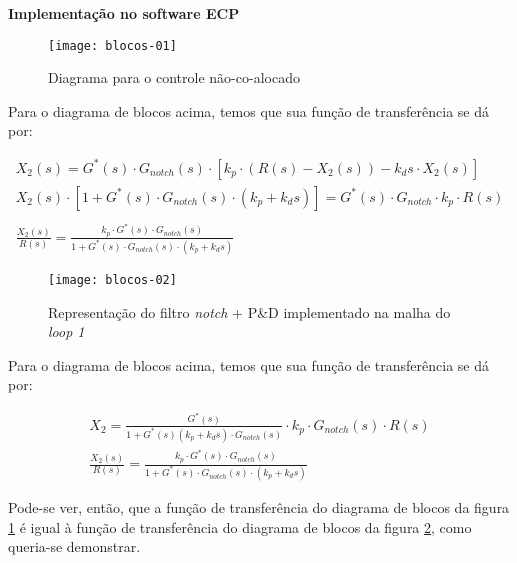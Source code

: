 \documentclass[a4paper,11pt]{article}
\begin{document}
\textbf{Implementação no software ECP}

\begin{figure}[H]
\centering
\texttt{[image: blocos-01]}
\caption{Diagrama para o controle não-co-alocado}
\label{fig:blocos-01}
\end{figure}

Para o diagrama de blocos acima, temos que sua função de transferência se dá
por:

\begin{gather*}
  X_2\left(s\right) = G^\ast\left(s\right) \cdot G_{notch}\left(s\right) \cdot
    \left[k_p \cdot \left(R\left(s\right) - X_2\left(s\right)\right) -
    k_d s \cdot X_2\left(s\right)\right] \\
  X_2\left(s\right) \cdot \left[1 +  G^\ast\left(s\right) \cdot
    G_{notch}\left(s\right) \cdot \left(k_p + k_d s\right)\right] =
    G^\ast\left(s\right) \cdot G_{notch} \cdot k_p \cdot R\left(s\right) \\ \\
  \frac{X_2\left(s\right)}{R\left(s\right)} = \frac{k_p \cdot
    G^\ast\left(s\right) \cdot G_{notch}\left(s\right)}{1 + G^\ast\left(s\right)
    \cdot G_{notch}\left(s\right) \cdot \left(k_p + k_d s\right)}
\end{gather*}

\begin{figure}[H]
\centering
\texttt{[image: blocos-02]}
\caption{Representação do filtro \textit{notch} + P\&D implementado na malha do
\textit{loop 1}}
\label{fig:blocos-02}
\end{figure}

Para o diagrama de blocos acima, temos que sua função de transferência se dá
por:

\begin{gather*}
  X_2 = \frac{G^\ast\left(s\right)}{1 + G^\ast\left(s\right) \left(k_p +
    k_d s\right) \cdot G_{notch}\left(s\right)} \cdot k_p \cdot
    G_{notch}\left(s\right) \cdot R\left(s\right) \\
  \frac{X_2\left(s\right)}{R\left(s\right)} = \frac{k_p \cdot
    G^\ast\left(s\right) \cdot G_{notch}\left(s\right)}{1 + G^\ast\left(s\right)
    \cdot G_{notch}\left(s\right) \cdot \left(k_p + k_d s\right)}
\end{gather*}

Pode-se ver, então, que a função de transferência do diagrama de blocos da
figura \ref{fig:blocos-01} é igual à função de transferência do diagrama de
blocos da figura \ref{fig:blocos-02}, como queria-se demonstrar.
\end{document}
